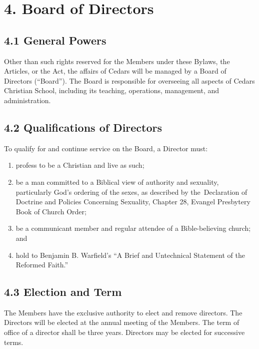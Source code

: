 \documentclass[
]{book}
\begin{document}
\section{4. Board of Directors}\label{board-of-directors}

\subsection{4.1 General Powers}\label{general-powers}

Other than such rights reserved for the Members under these Bylaws,
the Articles, or the Act, the affairs of Cedars will be managed by a
Board of Directors (``Board''). The Board is responsible for overseeing
all aspects of Cedars Christian School, including its teaching,
operations, management, and administration.

\subsection{4.2 Qualifications of Directors}\label{qualifications-of-directors}

To qualify for and continue service on the Board, a Director must:

\begin{enumerate}
\def\labelenumi{\alph{enumi})}
\item
  profess to be a Christian and live as such;
\item
  be a man committed to a Biblical view of authority and sexuality,
  particularly God's ordering of the sexes, as described by
  the~Declaration of Doctrine and Policies Concerning Sexuality,
  Chapter 28, Evangel Presbytery Book of Church Order;
\item
  be a communicant member and regular attendee of a Bible-believing
  church; and
\item
  hold to Benjamin B. Warfield's ``A Brief and Untechnical Statement of
  the Reformed Faith.''
\end{enumerate}

\subsection{4.3 Election and Term}\label{election-and-term}

The Members have the exclusive authority to elect and remove
directors. The Directors will be elected at the annual meeting of the
Members. The term of office of a director shall be three years.
Directors may be elected for successive terms.
\end{document}
